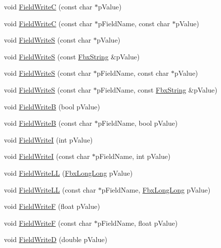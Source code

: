 \begin{Indent}
\begin{DoxyCompactItemize}
\item 
void \hyperlink{class_fbx_i_o_a4e4efe93bb869b9d71441a90c4a648c9}{Field\+WriteC} (const char $\ast$p\+Value)
\item 
void \hyperlink{class_fbx_i_o_ae96f0aa4e1cdf6e6ea07beca3ecc4a28}{Field\+WriteC} (const char $\ast$p\+Field\+Name, const char $\ast$p\+Value)
\item 
void \hyperlink{class_fbx_i_o_a6eb9d7a812fc72052ba98cda9ca1cae9}{Field\+WriteS} (const char $\ast$p\+Value)
\item 
void \hyperlink{class_fbx_i_o_aa51e41606cb25d2d5f3166998868a311}{Field\+WriteS} (const \hyperlink{class_fbx_string}{Fbx\+String} \&p\+Value)
\item 
void \hyperlink{class_fbx_i_o_a2cac4c5d6cc2c9fafdc2c9bafce9086b}{Field\+WriteS} (const char $\ast$p\+Field\+Name, const char $\ast$p\+Value)
\item 
void \hyperlink{class_fbx_i_o_ad3790a8fb438684c43a8d8e4d2047567}{Field\+WriteS} (const char $\ast$p\+Field\+Name, const \hyperlink{class_fbx_string}{Fbx\+String} \&p\+Value)
\item 
void \hyperlink{class_fbx_i_o_a3e244f27c043e399a0956bfab936799a}{Field\+WriteB} (bool p\+Value)
\item 
void \hyperlink{class_fbx_i_o_a53681cc7440a071f2a25a038923598a9}{Field\+WriteB} (const char $\ast$p\+Field\+Name, bool p\+Value)
\item 
void \hyperlink{class_fbx_i_o_a5410fb5480965b2ef80aff4afe6fe3b1}{Field\+WriteI} (int p\+Value)
\item 
void \hyperlink{class_fbx_i_o_a6e344f31120bc74e00d81f240025a5a2}{Field\+WriteI} (const char $\ast$p\+Field\+Name, int p\+Value)
\item 
void \hyperlink{class_fbx_i_o_a2a8f8d92408bb296784a0b47230220c8}{Field\+Write\+LL} (\hyperlink{fbxtypes_8h_ac34da60c22b0a7e1156e5480da7d71f1}{Fbx\+Long\+Long} p\+Value)
\item 
void \hyperlink{class_fbx_i_o_a212d63baf7648db3a0cc2434d4f075ec}{Field\+Write\+LL} (const char $\ast$p\+Field\+Name, \hyperlink{fbxtypes_8h_ac34da60c22b0a7e1156e5480da7d71f1}{Fbx\+Long\+Long} p\+Value)
\item 
void \hyperlink{class_fbx_i_o_a3b2b31091d13fa563b86078d2bae875d}{Field\+WriteF} (float p\+Value)
\item 
void \hyperlink{class_fbx_i_o_a6767a21f47f0b450ee48e110cc8b20a1}{Field\+WriteF} (const char $\ast$p\+Field\+Name, float p\+Value)
\item 
void \hyperlink{class_fbx_i_o_a76cf80355325f5b24675965d6126e9e1}{Field\+WriteD} (double p\+Value)

\end{DoxyCompactItemize}
\end{Indent}
